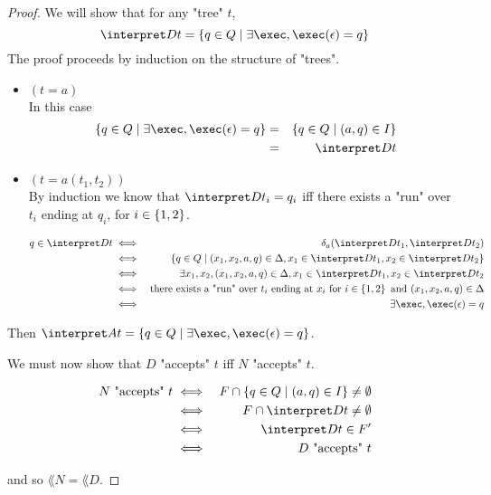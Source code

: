 \documentclass{article}
\begin{document}
\begin{proof}
	We will show that for any "tree" $t$,
	\[ \interpret D t = \setdef {q \in Q} {\exists \exec, \exec (\epsilon) = q} \]
	The proof proceeds by induction on the structure of "trees".
	\begin{itemize}
		\item $(t = a)$\\
		      In this case
		      \begin{eqnarray*}
			      \setdef {q \in Q} {\exists \exec, \exec (\epsilon) = q} &=&  \setdef {q \in Q} {(a,q) \in I} \\
			      &=& \interpret D t
		      \end{eqnarray*}
		\item $(t = a(t_1,t_2))$\\
		      By induction we know that
		      $\interpret D {t_i} = q_i$ iff there exists a "run" over $t_i$ ending at $q_i$, for $i \in \left\{1,2\right\}$.

		      \begin{eqnarray*}
			      q \in \interpret D t &\iff& \delta_a (\interpret D {t_1}, \interpret D {t_2}) \\
			      &\iff& \setdef {q \in  Q} {(x_1,x_2,a,q) \in \Delta, x_1 \in \interpret D {t_1}, x_2 \in \interpret D {t_2}} \\
			      &\iff& \exists x_1,x_2, (x_1,x_2,a,q) \in \Delta, x_1 \in \interpret D {t_1}, x_2 \in \interpret D {t_2} \\
			      &\iff& \text{there exists a "run" over }  t_i  \text { ending at } x_i \text { for  } i \in \set {1,2} \text{ and } (x_1,x_2,a,q) \in \Delta\\
			      &\iff& \exists \exec, \exec (\epsilon) = q
		      \end{eqnarray*}
	\end{itemize}
	Then $ \interpret A t = \setdef {q \in Q} {\exists \exec, \exec (\epsilon) = q} $.

	We must now show that $D$ "accepts" $t$ iff $N$ "accepts" $t$.

	\begin{eqnarray*}
		N \text{ "accepts" } t &\iff& F \cap \setdef {q \in Q} {(a,q) \in I} \neq \emptyset \\
		&\iff&   F \cap  \interpret D t \neq \emptyset \\
		&\iff& \interpret D t  \in F' \\
		&\iff& D \text{ "accepts" } t
	\end{eqnarray*}

	and so $\lang N = \lang D$.

\end{proof}
\end{document}
